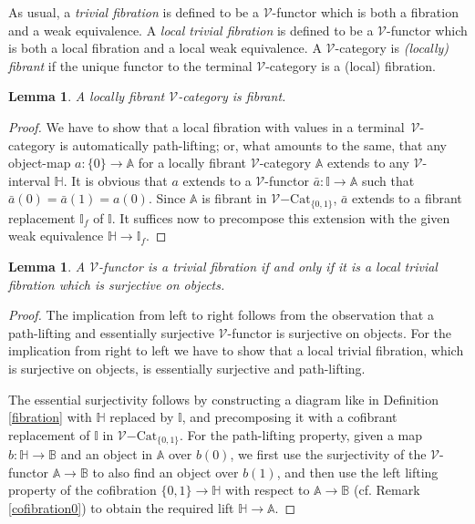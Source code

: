 \documentclass[10pt]{amsart}
\theoremstyle{plain}
\newtheorem{lma}[subsection]{Lemma}
\theoremstyle{remark}
\def\Vv{\mathcal{V}}
\def\Cat{\mathrm{Cat}}
\def\VCat{\Vv\mathrm{-}\Cat}
\def\Iso{\mathbb{I}}
\def\HH{\mathbb{H}}
\def\AA{\mathbb{A}}
\def\BB{\mathbb{B}}
\begin{document}
As usual, a \emph{trivial fibration} is defined to be a $\Vv$-functor which is both a fibration and a weak equivalence. A \emph{local trivial fibration} is defined to be a $\Vv$-functor which is both a local fibration and a local weak equivalence. A $\Vv$-category is \emph{(locally) fibrant} if the unique functor to the terminal $\Vv$-category is a (local) fibration.

\begin{lma}A locally fibrant $\Vv$-category is fibrant.\end{lma}

\begin{proof}We have to show that a local fibration with values in a terminal $\,\Vv$-category is automatically path-lifting; or, what amounts to the same, that any object-map $a:\{0\}\to\AA$ for a locally fibrant $\Vv$-category $\AA$ extends to any $\Vv$-interval $\HH$. It is obvious that $a$ extends to a $\Vv$-functor $\bar{a}:\Iso\to\AA$ such that $\bar{a}(0)=\bar{a}(1)=a(0)$. Since $\AA$ is fibrant in $\VCat_{\{0,1\}}$, $\bar{a}$ extends to a fibrant replacement $\Iso_f$ of $\Iso$. It suffices now to precompose this extension with the given weak equivalence $\HH\to\Iso_f$.\end{proof}

\begin{lma}\label{surjective}A $\Vv$-functor is a trivial fibration if and only if it is a local trivial fibration which is surjective on objects.\end{lma}

\begin{proof}The implication from left to right follows from the observation that a path-lifting and essentially surjective $\Vv$-functor is surjective on objects. For the implication from right to left we have to show that a local trivial fibration, which is surjective on objects, is essentially surjective and path-lifting.

The essential surjectivity follows by constructing a diagram like in Definition \ref{fibration} with $\HH$ replaced by $\Iso$, and precomposing it with a cofibrant replacement of $\Iso$ in $\VCat_{\{0,1\}}$. For the path-lifting property, given a map $b:\HH\to\BB$ and an object in $\AA$ over $b(0)$, we first use the surjectivity of the $\Vv$-functor $\AA\to\BB$ to also find an object over $b(1)$, and then use the left lifting property of the cofibration $\{0,1\}\to\HH$ with respect to $\AA\to\BB$ (cf. Remark \ref{cofibration0}) to obtain the required lift $\HH\to\AA$.\end{proof}
\end{document}
